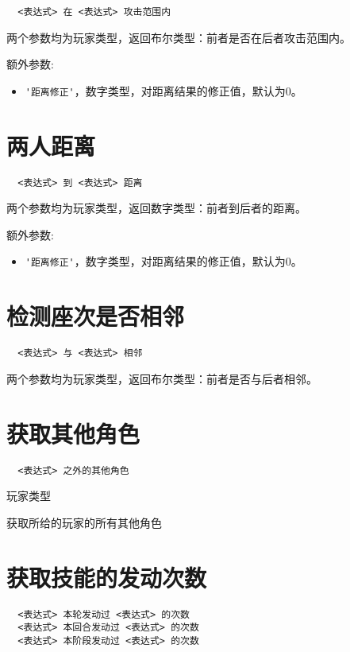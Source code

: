 \begin{verbatim}
  <表达式> 在 <表达式> 攻击范围内
\end{verbatim}

两个参数均为玩家类型，返回布尔类型：前者是否在后者攻击范围内。

额外参数:
\begin{itemize}
  \item \verb|'距离修正'|，数字类型，对距离结果的修正值，默认为0。
\end{itemize}

\section{两人距离}

\begin{verbatim}
  <表达式> 到 <表达式> 距离
\end{verbatim}

两个参数均为玩家类型，返回数字类型：前者到后者的距离。

额外参数:
\begin{itemize}
  \item \verb|'距离修正'|，数字类型，对距离结果的修正值，默认为0。
\end{itemize}

\section{检测座次是否相邻}

\begin{verbatim}
  <表达式> 与 <表达式> 相邻
\end{verbatim}

两个参数均为玩家类型，返回布尔类型：前者是否与后者相邻。

\section{获取其他角色}

\begin{verbatim}
  <表达式> 之外的其他角色
\end{verbatim}

玩家类型

获取所给的玩家的所有其他角色

\section{获取技能的发动次数}

\begin{verbatim}
  <表达式> 本轮发动过 <表达式> 的次数
  <表达式> 本回合发动过 <表达式> 的次数
  <表达式> 本阶段发动过 <表达式> 的次数
\end{verbatim}

